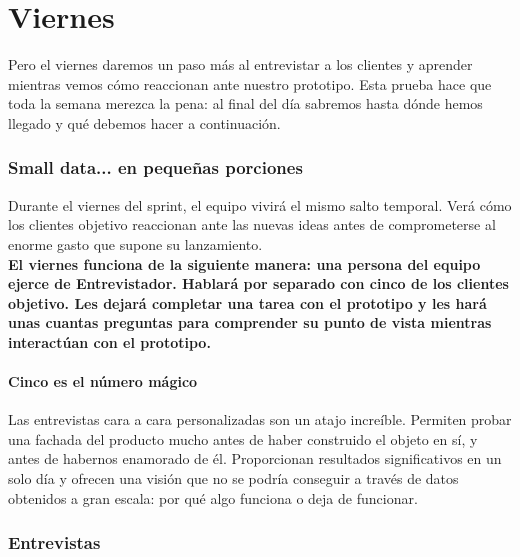\documentclass[10pt]{article}
\begin{document}
\part*{\center Viernes}
Pero el viernes daremos un paso más al entrevistar a los clientes y aprender mientras vemos cómo reaccionan ante nuestro prototipo. Esta prueba hace que toda la semana merezca la pena: al final del día sabremos hasta dónde hemos llegado y qué debemos hacer a continuación.
\begin{multicols}{2}
\section*{Small data... en pequeñas porciones}
Durante el viernes del sprint, el equipo vivirá el mismo salto temporal. Verá cómo los clientes objetivo reaccionan ante las nuevas ideas antes de comprometerse al enorme gasto que supone su lanzamiento.\\
\textbf{El viernes funciona de la siguiente manera: una persona del equipo ejerce de Entrevistador. Hablará por separado con cinco de los clientes objetivo. Les dejará completar una tarea con el prototipo y les hará unas cuantas preguntas para comprender su punto de vista mientras interactúan con el prototipo.}\\
\subsection*{Cinco es el número mágico}
Las entrevistas cara a cara personalizadas son un atajo increíble. Permiten probar una fachada del producto mucho antes de haber construido el objeto en sí, y antes de habernos enamorado de él. Proporcionan resultados significativos en un solo día y ofrecen una visión que no se podría conseguir a través de datos obtenidos a gran escala: por qué algo funciona o deja de funcionar.
\section*{Entrevistas}

\end{multicols}
\end{document}
